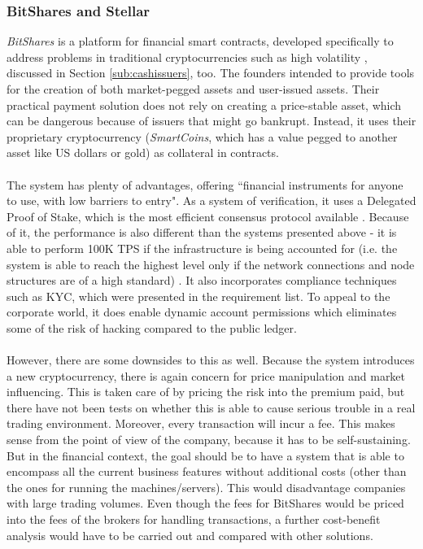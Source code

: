 \documentclass[12pt,twoside]{article}
\begin{document}
\subsubsection{BitShares and Stellar}
\label{sub:BSS}
\textit{BitShares} is a platform for financial smart contracts, developed specifically to address problems in traditional cryptocurrencies such as high volatility \cite{BS:TP}, discussed in Section \ref{sub:cashissuers}, too. The founders intended to provide tools for the creation of both market-pegged assets and user-issued assets. Their practical payment solution does not rely on creating a price-stable asset, which can be dangerous because of issuers that might go bankrupt. Instead, it uses their proprietary cryptocurrency (\textit{SmartCoins}, which has a value pegged to another asset like US dollars or gold) as collateral in contracts. 
\\ \\
The system has plenty of advantages, offering ``financial instruments for anyone to use, with low barriers to entry". As a system of verification, it uses a Delegated Proof of Stake, which is the most efficient consensus protocol available \cite{BS:DPOS}. Because of it, the performance is also different than the systems presented above - it is able to perform 100K TPS if the infrastructure is being accounted for (i.e. the system is able to reach the highest level only if the network connections and node structures are of a high standard) \cite{BS:tech}. It also incorporates compliance techniques such as KYC, which were presented in the requirement list. To appeal to the corporate world, it does enable dynamic account permissions which eliminates some of the risk of hacking compared to the public ledger. 
\\ \\
However, there are some downsides to this as well. Because the system introduces a new cryptocurrency, there is again concern for price manipulation and market influencing. This is taken care of by pricing the risk into the premium paid, but there have not been tests on whether this is able to cause serious trouble in a real trading environment. Moreover, every transaction will incur a fee. This makes sense from the point of view of the company, because it has to be self-sustaining. But in the financial context, the goal should be to have a system that is able to encompass all the current business features without additional costs (other than the ones for running the machines/servers). This would disadvantage companies with large trading volumes. Even though the fees for BitShares would be priced into the fees of the brokers for handling transactions, a further cost-benefit analysis would have to be carried out and compared with other solutions.
\end{document}
